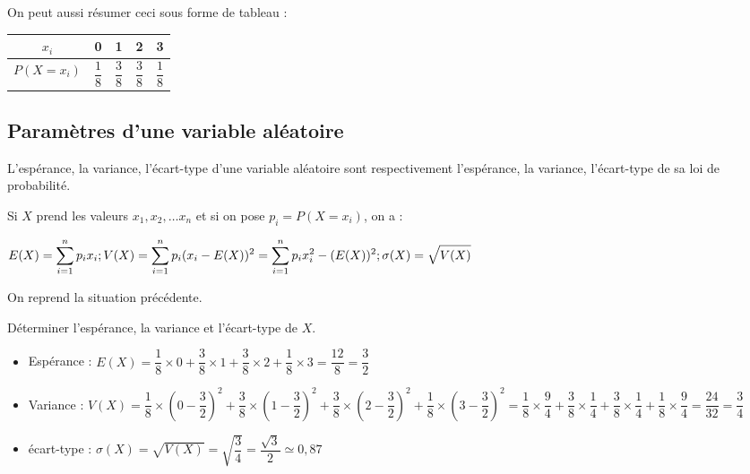 \documentclass[french]{book}
\newcommand{\ds}{\displaystyle}
\begin{document}
On peut aussi r\'esumer ceci sous forme de tableau :

\begin{center}
\renewcommand{\arraystretch}{3}
\begin{tabular}{|c|c|c|c|c|} \hline
$x_i$ & 0 & 1 & 2 & 3 \\ \hline
$P(X=x_i)$ & $\dfrac{1}{8}$ & $\dfrac{3}{8}$ & $\dfrac{3}{8}$ & $\dfrac{1}{8}$ \\ \hline
\end{tabular}
\end{center}



\subsection{Param\`etres d'une variable al\'eatoire}
\begin{defn}
L'esp\'erance, la variance, l'\'ecart-type d'une variable al\'eatoire sont respectivement l'esp\'erance, la variance, l'\'ecart-type de sa loi de probabilit\'e.

Si $X$ prend les valeurs $x_1,x_2,\ldots x_n$ et si on pose $p_i=P(X=x_i)$, on a :

$E(X)=\ds\sum_{i=1}^np_ix_i ;\hfill V(X)=\ds\sum_{i=1}^np_i(x_i-E(X))^2=\sum_{i=1}^np_ix_i^2-(E(X))^2 ;
\hfill \sigma(X)=\sqrt{V(X)}$
\end{defn}

\begin{exemple}
On reprend la situation pr\'ec\'edente.

D\'eterminer l'esp\'erance, la variance et l'\'ecart-type de $X$.
\end{exemple}


\begin{itemize}
\item[$\bullet$]  Esp\'erance : $E(X)=\dfrac{1}{8}\times0 + \dfrac{3}{8}\times1 + \dfrac{3}{8}\times2 + \dfrac{1}{8}\times3 = \dfrac{12}{8} = \dfrac{3}{2}$
\item[$\bullet$]  Variance : $V(X) = \dfrac{1}{8}\times\left( 0-\dfrac{3}{2} \right)^2 + \dfrac{3}{8}\times\left( 1-\dfrac{3}{2} \right)^2 + \dfrac{3}{8}\times\left( 2-\dfrac{3}{2} \right)^2 + \dfrac{1}{8}\times\left( 3-\dfrac{3}{2} \right)^2 = \dfrac{1}{8}\times\dfrac{9}{4} + \dfrac{3}{8}\times\dfrac{1}{4} + \dfrac{3}{8}\times\dfrac{1}{4} + \dfrac{1}{8}\times\dfrac{9}{4} = \dfrac{24}{32} = \dfrac{3}{4}$
\item[$\bullet$]  \'ecart-type : $\sigma(X) = \sqrt{V(X)} = \sqrt{\dfrac{3}{4}} = \dfrac{\sqrt{3}}{2} \simeq 0,87$
\end{itemize}
\end{document}
